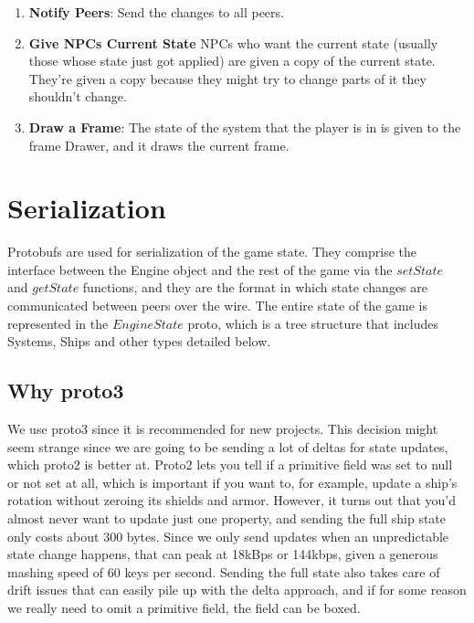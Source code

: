 \documentclass{article}
\begin{document}
\begin{enumerate}
\item \textbf{Notify Peers}: Send the changes to all peers.

\item \textbf{Give NPCs Current State} NPCs who want the current state (usually those whose state just got applied) are given a copy of the current state. They're given a copy because they might try to change parts of it they shouldn't change.
\item \textbf{Draw a Frame}: The state of the system that the player is in is given to the frame Drawer, and it draws the current frame.
\end{enumerate}

\section{Serialization}
Protobufs are used for serialization of the game state. They comprise the interface between the Engine object and the rest of the game via the $setState$ and $getState$ functions, and they are the format in which state changes are communicated between peers over the wire. The entire state of the game is represented in the $EngineState$ proto, which is a tree structure that includes Systems, Ships and other types detailed below.

\subsection{Why proto3}
We use proto3 since it is recommended for new projects. This decision might seem strange since we are going to be sending a lot of deltas for state updates, which proto2 is better at. Proto2 lets you tell if a primitive field was set to null or not set at all, which is important if you want to, for example, update a ship's rotation without zeroing its shields and armor. However, it turns out that you'd almost never want to update just one property, and sending the full ship state only costs about 300 bytes. Since we only send updates when an unpredictable state change happens, that can peak at 18kBps or 144kbps, given a generous mashing speed of 60 keys per second. Sending the full state also takes care of drift issues that can easily pile up with the delta approach, and if for some reason we really need to omit a primitive field, the field can be boxed.
\end{document}
